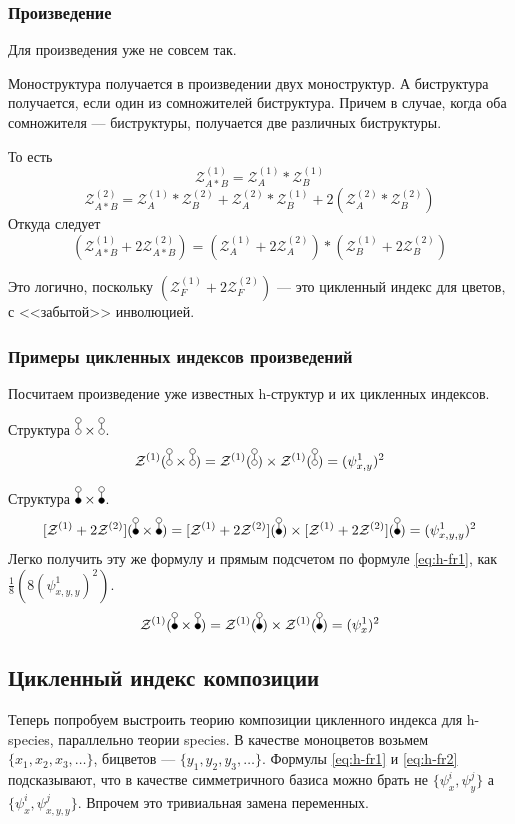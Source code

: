 \subsubsection{Произведение}
Для произведения уже не совсем так. 
\begin{statement}
Моноструктура получается
в произведении двух моноструктур. А биструктура получается, если один из
сомножителей биструктура. Причем в случае, когда оба сомножителя ---
биструктуры, получается две различных биструктуры. 
\end{statement}
То есть
$$
\mathcal Z_{A * B}^{(1)} = \mathcal Z_A^{(1)} * \mathcal Z_B^{(1)}
$$
$$
\mathcal Z_{A * B}^{(2)} = 
\mathcal Z_A^{(1)} * \mathcal Z_B^{(2)} + 
\mathcal Z_A^{(2)} * \mathcal Z_B^{(1)} +
2 (\mathcal Z_A^{(2)} * \mathcal Z_B^{(2)})
$$
Откуда следует
$$
(\mathcal Z_{A * B}^{(1)} + 2\mathcal Z_{A * B}^{(2)}) = 
(\mathcal Z_A^{(1)} + 2\mathcal Z_A^{(2)}) * 
(\mathcal Z_B^{(1)} + 2\mathcal Z_B^{(2)})
$$

\begin{remark}
Это логично, поскольку $(\mathcal Z_F^{(1)} + 2\mathcal Z_F^{(2)})$ --- это
цикленный индекс для цветов, с <<забытой>> инволюцией.
\end{remark}

\subsubsection{Примеры цикленных индексов произведений}
Посчитаем произведение уже известных h-структур и их цикленных индексов.

\begin{example}
Структура $\dA \times \dA$.
$$
\mathcal Z^{(1)}(\dA \times \dA) = \mathcal Z^{(1)}(\dA) \times \mathcal
Z^{(1)}(\dA) = (\psi_{x, y}^1)^2
$$
\end{example}
\begin{example}
Структура $\dB \times \dB$.
$$
\Zfull(\dB \times \dB) = \Zfull(\dB) \times \Zfull(\dB) =(\psi_{x, y, y}^1)^2
$$
Легко получить эту же формулу и прямым подсчетом по формуле \ref{eq:h-fr1}, как
$\frac{1}{8}(8(\psi_{x, y, y}^1)^2)$.
$$
\mathcal Z^{(1)}(\dB \times \dB) = \mathcal Z^{(1)}(\dB) \times \mathcal
Z^{(1)}(\dB) =(\psi_{x}^1)^2
$$
\end{example}

\subsection{Цикленный индекс композиции}
Теперь попробуем выстроить теорию композиции цикленного индекса для h-species,
параллельно теории species. В качестве моноцветов возьмем $\{x_1, x_2, x_3,
\dots\}$, бицветов --- $\{y_1, y_2, y_3, \dots\}$. Формулы \ref{eq:h-fr1} и
\ref{eq:h-fr2} подсказывают, что в качестве симметричного базиса можно брать не
$\{\psi_x^i, \psi_y^j\}$ а $\{\psi_x^i, \psi_{x,y,y}^j\}$. Впрочем это
тривиальная замена переменных.

